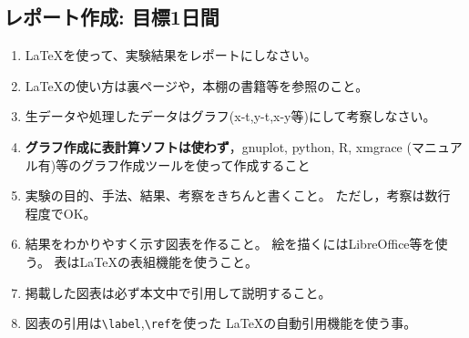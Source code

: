 \documentclass{jsarticle}
\begin{document}
\subsection{レポート作成: 目標1日間}
\begin{enumerate}
\item \LaTeX を使って、実験結果をレポートにしなさい。
\item \LaTeX の使い方は裏ページや，本棚の書籍等を参照のこと。
\item 生データや処理したデータはグラフ(x-t,y-t,x-y等)にして考察しなさい。
\item \textbf{グラフ作成に表計算ソフトは使わず}，gnuplot, python, R, xmgrace (マニュアル有)等のグラフ作成ツールを使って作成すること
\item 実験の目的、手法、結果、考察をきちんと書くこと。
  ただし，考察は数行程度でOK。
\item 結果をわかりやすく示す図表を作ること。
  絵を描くにはLibreOffice等を使う。
  表は\LaTeX の表組機能を使うこと。
\item 掲載した図表は必ず本文中で引用して説明すること。
\item 図表の引用は\verb|\label|,\verb|\ref|を使った
  \LaTeX の自動引用機能を使う事。
\end{enumerate}
\end{document}
